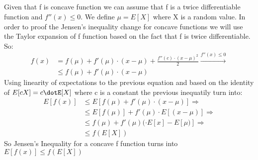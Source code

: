 \documentclass[11pt]{537homework}
\begin{document}
\subsection{}
Given that f is concave function we can assume that f is a twice differentiable function and $f''(x) \leq 0$. We define $\mu = E[X]$ where X is a random value. In order to proof the Jensen's inequality change for concave functions we will use the Taylor expansion of f function based on the fact that f is twice differentiable. So:
\begingroup
\allowdisplaybreaks
\begin{align*}
  f(x) &= f(\mu) + f'(\mu)\cdot(x-\mu) + \frac{f''(c)\cdot (x-\mu)^2}{2} \xrightarrow{f''(x) \leq 0} \\
       & \leq f(\mu) + f'(\mu)\cdot(x-\mu) 
\end{align*}
\endgroup
Using linearity of expectations to the previous equation and based on the identity of $E[cX]=c\dotE[X]$ where c is a constant the previous inequatily turn into:
\begingroup
\allowdisplaybreaks
\begin{align*}
  E[f(x)] & \leq E[f(\mu) + f'(\mu)\cdot(x-\mu)] \Longrightarrow\\
          & \leq E[f(\mu)] + f'(\mu)\cdot E[(x-\mu)] \Longrightarrow\\    
          & \leq f(\mu) + f'(\mu)(\cdot E[x]-E[\mu)] \Longrightarrow\\
          & \leq f(E[X])
\end{align*}
\endgroup
So Jensen’s Inequality for a concave f function turns into $E[f(x)] \leq f(E[X])$
\end{document}
